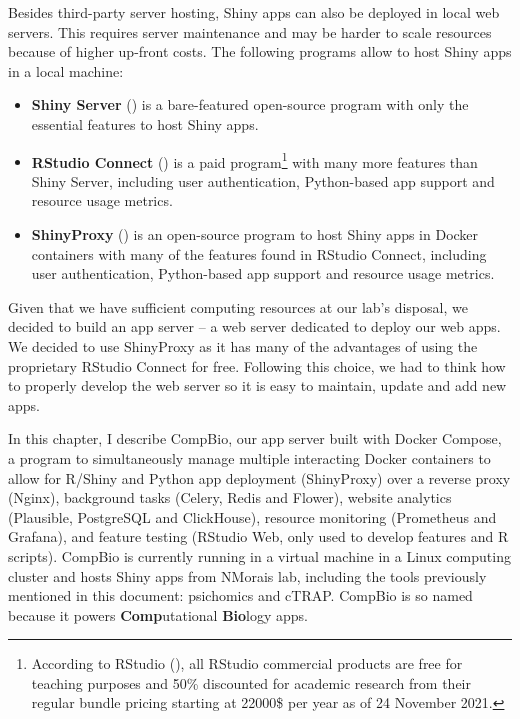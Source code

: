 Besides third-party server hosting, Shiny apps can also be deployed in local web servers. This requires server maintenance and may be harder to scale resources because of higher up-front costs. The following programs allow to host Shiny apps in a local machine:

\begin{itemize}
	\item \textbf{Shiny Server} () is a bare-featured open-source program with only the essential features to host Shiny apps.
	\item \textbf{RStudio Connect} () is a paid program\footnote{According to RStudio (), all RStudio commercial products are free for teaching purposes and 50\% discounted for academic research from their regular bundle pricing starting at 22000\$ per year as of 24 November 2021.} with many more features than Shiny Server, including user authentication, Python-based app support and resource usage metrics.
	\item \textbf{ShinyProxy} () is an open-source program to host Shiny apps in Docker containers with many of the features found in RStudio Connect, including user authentication, Python-based app support and resource usage metrics.
\end{itemize}

Given that we have sufficient computing resources at our lab's disposal, we decided to build an app server -- a web server dedicated to deploy our web apps. We decided to use ShinyProxy as it has many of the advantages of using the proprietary RStudio Connect for free. Following this choice, we had to think how to properly develop the web server so it is easy to maintain, update and add new apps.


In this chapter, I describe CompBio, our app server built with Docker Compose, a program to simultaneously manage multiple interacting Docker containers to allow for R/Shiny and Python app deployment (ShinyProxy) over a reverse proxy (Nginx), background tasks (Celery, Redis and Flower), website analytics (Plausible, PostgreSQL and ClickHouse), resource monitoring (Prometheus and Grafana), and feature testing (RStudio Web, only used to develop features and R scripts). CompBio is currently running in a virtual machine in a Linux computing cluster and hosts Shiny apps from NMorais lab, including the tools previously mentioned in this document: psichomics and cTRAP. CompBio is so named because it powers \textbf{Comp}utational \textbf{Bio}logy apps.

